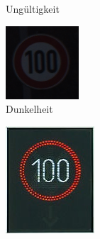 \begin{figure}[H]
\begin{subfigure}[b]{0.125\textwidth}
       \caption{Ungültigkeit}
       \label{fig:abgeklebt}
   \end{subfigure}
   \hspace{3em}%
   \begin{subfigure}[b]{0.125\textwidth}
       \centering
       \includegraphics[height=\textwidth]{../images/Schilder Beispiele/Dunkelheit.png}
       \caption{Dunkelheit}
       \label{fig:dunkelheit}
   \end{subfigure}
   \hspace{3em}%
   \begin{subfigure}[b]{0.125\textwidth}
    \centering
    \includegraphics[height=\textwidth]{../images/Schilder Beispiele/Wechselverkehrszeichen.jpg}

\end{subfigure}
\end{figure}
